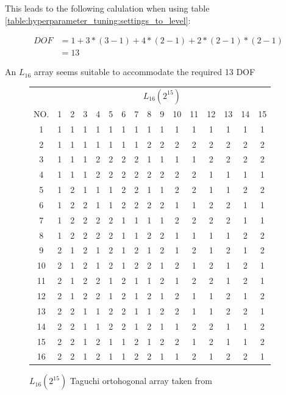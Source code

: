 This leads to the following calulation when using table \ref{table:hyperparameter_tuning:settings_to_level}:

\begin{equation} \label{DOF}
	\begin{split}
		DOF & = 1 + 3 * (3 - 1) + 4 * (2 - 1) + 2 * (2 - 1) * (2 - 1) \\
		& = 13
	\end{split}
\end{equation}

An $L_{16}$ array seems suitable to accommodate the required 13 DOF


\begin{figure}[H]
	\centering
\begin{tabular}{ |c||c|c|c|c|c|c|c|c|c|c|c|c|c|c|c|  }
	\hline
	   & \multicolumn{15}{|c|}{ $L_{16}(2^{15})$ } \\
	NO.& 1 & 2 & 3 & 4 & 5 & 6 & 7 & 8 & 9 & 10& 11& 12& 13& 14&15\\
	\hline
	1  & 1 & 1 & 1 & 1 & 1 & 1 & 1 & 1 & 1 & 1 & 1 & 1 & 1 & 1 & 1\\
	2  & 1 & 1 & 1 & 1 & 1 & 1 & 1 & 2 & 2 & 2 & 2 & 2 & 2 & 2 & 2\\
	3  & 1 & 1 & 1 & 2 & 2 & 2 & 2 & 1 & 1 & 1 & 1 & 2 & 2 & 2 & 2\\
	4  & 1 & 1 & 1 & 2 & 2 & 2 & 2 & 2 & 2 & 2 & 2 & 1 & 1 & 1 & 1\\
	5  & 1 & 2 & 1 & 1 & 1 & 2 & 2 & 1 & 1 & 2 & 2 & 1 & 1 & 2 & 2\\
	6  & 1 & 2 & 2 & 1 & 1 & 2 & 2 & 2 & 2 & 1 & 1 & 2 & 2 & 1 & 1\\
	7  & 1 & 2 & 2 & 2 & 2 & 1 & 1 & 1 & 1 & 2 & 2 & 2 & 2 & 1 & 1\\
	8  & 1 & 2 & 2 & 2 & 2 & 1 & 1 & 2 & 2 & 1 & 1 & 1 & 1 & 2 & 2\\
	9  & 2 & 1 & 2 & 1 & 2 & 1 & 2 & 1 & 2 & 1 & 2 & 1 & 2 & 1 & 2\\
	10 & 2 & 1 & 2 & 1 & 2 & 1 & 2 & 2 & 1 & 2 & 1 & 2 & 1 & 2 & 1\\
	11 & 2 & 1 & 2 & 2 & 1 & 2 & 1 & 1 & 2 & 1 & 2 & 2 & 1 & 2 & 1\\
	12 & 2 & 1 & 2 & 2 & 1 & 2 & 1 & 2 & 1 & 2 & 1 & 1 & 2 & 1 & 2\\
	13 & 2 & 2 & 1 & 1 & 2 & 2 & 1 & 1 & 2 & 2 & 1 & 1 & 2 & 2 & 1\\
	14 & 2 & 2 & 1 & 1 & 2 & 2 & 1 & 2 & 1 & 1 & 2 & 2 & 1 & 1 & 2\\
	15 & 2 & 2 & 1 & 2 & 1 & 1 & 2 & 1 & 2 & 2 & 1 & 2 & 1 & 1 & 2\\
	16 & 2 & 2 & 1 & 2 & 1 & 1 & 2 & 2 & 1 & 1 & 2 & 1 & 2 & 2 & 1\\
	\hline
\end{tabular}
\caption{ $L_{16}(2^{15})$ Taguchi ortohogonal array taken from \cite{roy_primer_1990}}
\end{figure}


